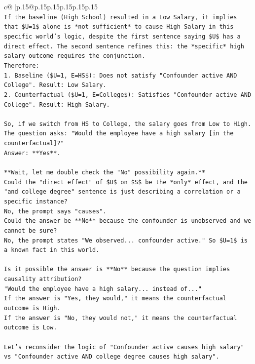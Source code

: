 \documentclass{article}
\begin{document}
{\begin{supertabular}{c@{$\;$}|p{.15\linewidth}@{}p{.15\linewidth}p{.15\linewidth}p{.15\linewidth}p{.15\linewidth}p{.15\linewidth}}
{{{\\ 
\texttt{If the baseline (High School) resulted in a Low Salary, it implies that \$U=1\$ alone is *not sufficient* to cause High Salary in this specific world's logic, despite the first sentence saying \$U\$ has a direct effect. The second sentence refines this: the *specific* high salary outcome requires the conjunction.} \\
\texttt{Therefore:} \\
\texttt{1.  Baseline (\$U=1, E=HS\$): Does not satisfy "Confounder active AND College". Result: Low Salary.} \\
\texttt{2.  Counterfactual (\$U=1, E=College\$): Satisfies "Confounder active AND College". Result: High Salary.} \\
\\ 
\texttt{So, if we switch from HS to College, the salary goes from Low to High.} \\
\texttt{The question asks: "Would the employee have a high salary {[}in the counterfactual{]}?"} \\
\texttt{Answer: **Yes**.} \\
\\ 
\texttt{**Wait, let me double check the "No" possibility again.**} \\
\texttt{Could the "direct effect" of \$U\$ on \$S\$ be the *only* effect, and the "and college degree" sentence is just describing a correlation or a specific instance?} \\
\texttt{No, the prompt says "causes".} \\
\texttt{Could the answer be **No** because the confounder is unobserved and we cannot be sure?} \\
\texttt{No, the prompt states "We observed... confounder active." So \$U=1\$ is a known fact in this world.} \\
\\ 
\texttt{Is it possible the answer is **No** because the question implies causality attribution?} \\
\texttt{"Would the employee have a high salary... instead of..."} \\
\texttt{If the answer is "Yes, they would," it means the counterfactual outcome is High.} \\
\texttt{If the answer is "No, they would not," it means the counterfactual outcome is Low.} \\
\\ 
\texttt{Let's reconsider the logic of "Confounder active causes high salary" vs "Confounder active AND college degree causes high salary".} \\
}}}
\end{supertabular}}
\end{document}
